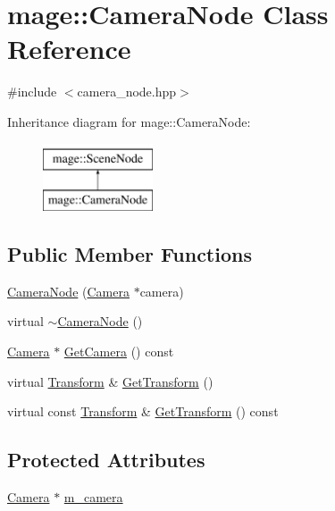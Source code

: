 \hypertarget{classmage_1_1_camera_node}{}\section{mage\+:\+:Camera\+Node Class Reference}
\label{classmage_1_1_camera_node}


{\ttfamily \#include $<$camera\+\_\+node.\+hpp$>$}

Inheritance diagram for mage\+:\+:Camera\+Node\+:\begin{figure}[H]
\begin{center}
\leavevmode
\includegraphics[height=2.000000cm]{classmage_1_1_camera_node}
\end{center}
\end{figure}
\subsection*{Public Member Functions}
\begin{DoxyCompactItemize}
\item 
\hyperlink{classmage_1_1_camera_node_a6e1a32bd7a1c8cae09439f0922a5192a}{Camera\+Node} (\hyperlink{classmage_1_1_camera}{Camera} $\ast$camera)
\item 
virtual \hyperlink{classmage_1_1_camera_node_a2b66360b99bf03ee2f66a3a74be31792}{$\sim$\+Camera\+Node} ()
\item 
\hyperlink{classmage_1_1_camera}{Camera} $\ast$ \hyperlink{classmage_1_1_camera_node_a7cd05fd41271259870483de5b3ed6ebe}{Get\+Camera} () const
\item 
virtual \hyperlink{structmage_1_1_transform}{Transform} \& \hyperlink{classmage_1_1_camera_node_a24b0b049d4235df85d61138d74483b02}{Get\+Transform} ()
\item 
virtual const \hyperlink{structmage_1_1_transform}{Transform} \& \hyperlink{classmage_1_1_camera_node_a3465efde7535f4aebe7b371f5feeae14}{Get\+Transform} () const
\end{DoxyCompactItemize}
\subsection*{Protected Attributes}
\begin{DoxyCompactItemize}
\item 
\hyperlink{classmage_1_1_camera}{Camera} $\ast$ \hyperlink{classmage_1_1_camera_node_aee902112c2e70e8de69b69aed303ca1f}{m\+\_\+camera}
\end{DoxyCompactItemize}
